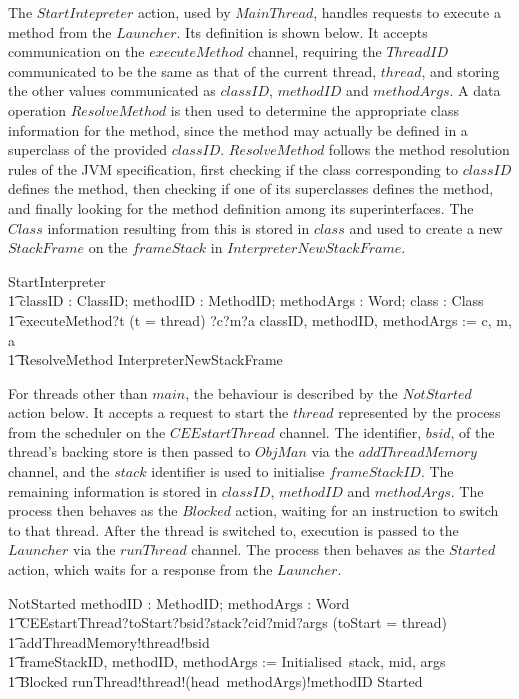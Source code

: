 The $StartIntepreter$ action, used by $MainThread$, handles requests
to execute a method from the $Launcher$.
Its definition is shown below.
It accepts communication on the $executeMethod$ channel, requiring the
$ThreadID$ communicated to be the same as that of the current thread,
$thread$, and storing the other values communicated as $classID$,
$methodID$ and $methodArgs$.
A data operation $ResolveMethod$ is then used to determine the
appropriate class information for the method, since the method may
actually be defined in a superclass of the provided $classID$.
$ResolveMethod$ follows the method resolution rules of the JVM
specification, first checking if the class corresponding to $classID$
defines the method, then checking if one of its superclasses defines
the method, and finally looking for the method definition among its
superinterfaces.
The $Class$ information resulting from this is stored in $class$ and
used to create a new $StackFrame$ on the $frameStack$ in
$InterpreterNewStackFrame$.
\begin{circusaction}
  StartInterpreter \circdef \\
  \t1  \circvar classID : ClassID; methodID : MethodID; methodArgs : \seq Word; class : Class \circspot \\
  \t1 executeMethod?t \prefixcolon (t = thread) ?c?m?a \then classID, methodID, methodArgs := c, m, a \circseq \\
  \t1 \lschexpract ResolveMethod \rschexpract \circseq \lschexpract InterpreterNewStackFrame \rschexpract
\end{circusaction}

For threads other than $main$, the behaviour is described by the
$NotStarted$ action below.
It accepts a request to start the $thread$ represented by the process
from the scheduler on the $CEEstartThread$ channel.
The identifier, $bsid$, of the thread's backing store is then passed
to $ObjMan$ via the $addThreadMemory$ channel, and the $stack$
identifier is used to initialise $frameStackID$.
The remaining information is stored in $classID$, $methodID$ and
$methodArgs$. 
The process then behaves as the $Blocked$ action, waiting for an
instruction to switch to that thread.
After the thread is switched to, execution is passed to the $Launcher$
via the $runThread$ channel.
The process then behaves as the $Started$ action, which waits for a
response from the $Launcher$.
\begin{circusaction}
  NotStarted \circdef \circvar methodID : MethodID; methodArgs : \seq Word \circspot \\
  \t1 CEEstartThread?toStart?bsid?stack?cid?mid?args \prefixcolon (toStart = thread) \\
  \t1 {} \then addThreadMemory!thread!bsid \\
  \t1 {} \then frameStackID, methodID, methodArgs := Initialised~stack, mid, args \circseq \\
  \t1 Blocked \circseq runThread!thread!(head~methodArgs)!methodID \then Started
\end{circusaction}

